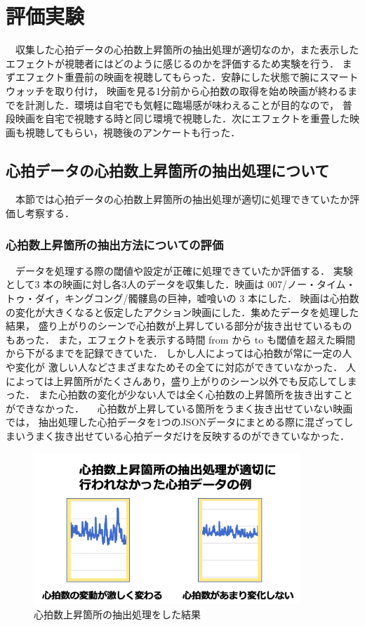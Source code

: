 \thispagestyle{myheadings}
\chapter{評価実験}

　収集した心拍データの心拍数上昇箇所の抽出処理が適切なのか，また表示したエフェクトが視聴者にはどのように感じるのかを評価するため実験を行う．
まずエフェクト重畳前の映画を視聴してもらった．安静にした状態で腕にスマートウォッチを取り付け，
映画を見る1分前から心拍数の取得を始め映画が終わるまでを計測した．環境は自宅でも気軽に臨場感が味わえることが目的なので，
普段映画を自宅で視聴する時と同じ環境で視聴した．次にエフェクトを重畳した映画も視聴してもらい，視聴後のアンケートも行った．

\section{心拍データの心拍数上昇箇所の抽出処理について}
　本節では心拍データの心拍数上昇箇所の抽出処理が適切に処理できていたか評価し考察する．

\subsection{心拍数上昇箇所の抽出方法についての評価}
　データを処理する際の閾値や設定が正確に処理できていたか評価する．
実験として3 本の映画に対し各3人のデータを収集した．映画は 007/ノー・タイム・トゥ・ダイ，キングコング/髑髏島の巨神，嘘喰いの 3 本にした．
映画は心拍数の変化が大きくなると仮定したアクション映画にした．集めたデータを処理した結果，
盛り上がりのシーンで心拍数が上昇している部分が抜き出せているものもあった．
また，エフェクトを表示する時間 from から to も閾値を超えた瞬間から下がるまでを記録できていた．
しかし人によっては心拍数が常に一定の人や変化が 激しい人などさまざまなためその全てに対応ができていなかった．
人によっては上昇箇所がたくさんあり，盛り上がりのシーン以外でも反応してしまった．
また心拍数の変化が少ない人では全く心拍数の上昇箇所を抜き出すことができなかった．
　心拍数が上昇している箇所をうまく抜き出せていない映画では，
抽出処理した心拍データを1つのJSONデータにまとめる際に混ざってしまいうまく抜き出せている心拍データだけを反映するのができていなかった．

\begin{figure}[H]
    \centering
    \includegraphics[width=10cm]{images/chapter4/miss.png}
    \caption{心拍数上昇箇所の抽出処理をした結果}
\end{figure}


